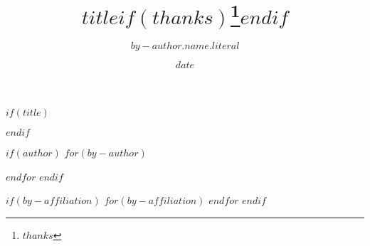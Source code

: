$if(title)$
\title{$title$$if(thanks)$\thanks{$thanks$}$endif$}
$endif$

$if(author)$
$for(by-author)$
\author[$for(by-author.affiliations)$$it.number$$sep$, $endfor$]{$by-author.name.literal$}
$endfor$
$endif$

$if(by-affiliation)$
$for(by-affiliation)$
$endfor$
$endif$

\date{$date$}